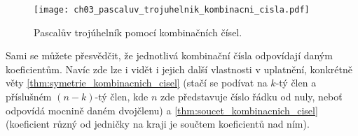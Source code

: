 \begin{figure}[H]
    \centering
    \texttt{[image: ch03\_pascaluv\_trojuhelnik\_kombinacni\_cisla.pdf]}
    \caption{Pascalův trojúhelník pomocí kombinačních čísel.}
    \label{fig:pascaluv_trojuhelnik_kombinacni_cisla}
\end{figure}
Sami se můžete přesvědčit, že jednotlivá kombinační čísla odpovídají daným koeficientům. Navíc zde lze i vidět i jejich další vlastnosti v uplatnění, konkrétně věty \ref{thm:symetrie_kombinacnich_cisel} (stačí se podívat na $k$-tý člen a příslušném $(n-k)$-tý člen, kde $n$ zde představuje číslo řádku od nuly, neboť odpovídá mocnině daném dvojčlenu) a \ref{thm:soucet_kombinacnich_cisel} (koeficient různý od jedničky na kraji je součtem koeficientů nad ním).\par

